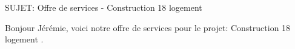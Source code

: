 SUJET: Offre de services - Construction 18 logement \par Bonjour Jérémie, voici notre offre de services pour le projet: Construction 18 logement .